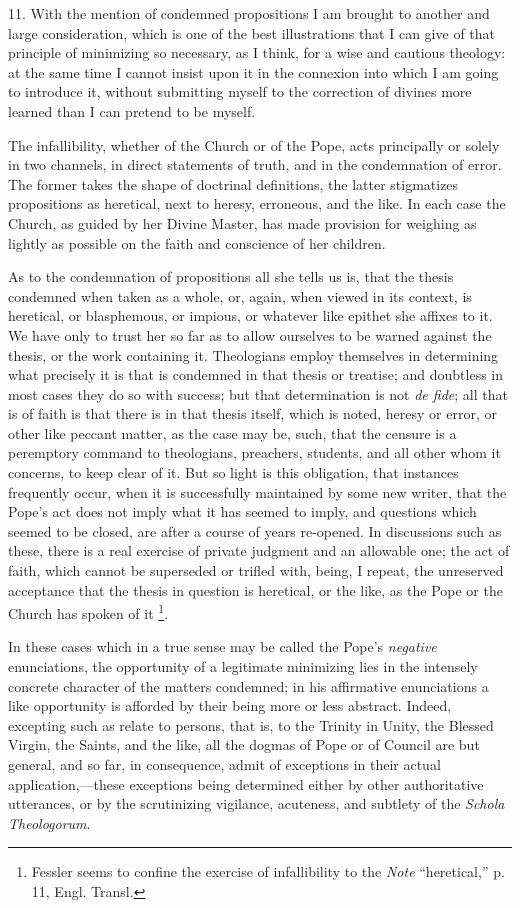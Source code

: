 11. With the mention of condemned propositions I am brought to
another and large consideration, which is one of the best illustrations
that I can give of that principle of minimizing so necessary, as I
think, for a wise and cautious theology: at the same time I cannot
insist upon it in the connexion into which I am going to introduce it,
without submitting myself to the correction of divines more
learned than I can pretend to be myself.

The infallibility, whether of the Church or of the Pope, acts
principally or solely in two channels, in direct statements of truth,
and in the condemnation of error. The former takes the shape of
doctrinal definitions, the latter stigmatizes propositions as heretical,
next to heresy, erroneous, and the like. In each case the Church, as
guided by her Divine Master, has made provision for weighing as lightly
as possible on the faith and conscience of her children.

As to the condemnation of propositions all she tells us is, that the
thesis condemned when taken as a whole, or, again, when viewed in its
context, is heretical, or blasphemous, or impious, or whatever like
epithet she affixes to it. We have only to trust her so far as to allow
ourselves to be warned against the thesis, or the work containing it.
Theologians employ themselves in determining what precisely it is that
is condemned in that thesis or treatise; and doubtless in most cases
they do so with success; but that determination is not \emph{de fide};
all that is of faith is that there is in that thesis itself, which is
noted, heresy or error, or other like peccant matter, as the case may
be, such, that the censure is a peremptory command to theologians,
preachers, students, and all other whom it concerns, to keep clear of
it. But so light is this obligation, that instances frequently occur,
when it is successfully maintained by some new writer, that the Pope's
act does not imply what it has seemed to imply, and questions which
seemed to be closed, are after a course of years re-opened. In
discussions such as these, there is a real exercise of private
judgment and an allowable one; the act of faith, which cannot be
superseded or trifled with, being, I repeat, the unreserved acceptance
that the thesis in question is heretical, or the like, as the Pope or
the Church has spoken of it \footnote{Fessler seems to confine the exercise of infallibility to the \emph{Note}
``heretical,'' p. 11, Engl. Transl.}.

In these cases which in a true sense may be called the Pope's \emph{negative} enunciations, the opportunity of a legitimate minimizing lies
in the intensely concrete character of the matters condemned; in his
affirmative enunciations a like opportunity is afforded by their being
more or less abstract. Indeed, excepting such as relate to persons, that
is, to the Trinity in Unity, the Blessed Virgin, the Saints, and the
like, all the dogmas of Pope or of Council are but general, and so far,
in consequence, admit of exceptions in their actual application,—these
exceptions being determined either by other authoritative utterances, or
by the scrutinizing vigilance, acuteness, and subtlety of the \emph{Schola
Theologorum}.

